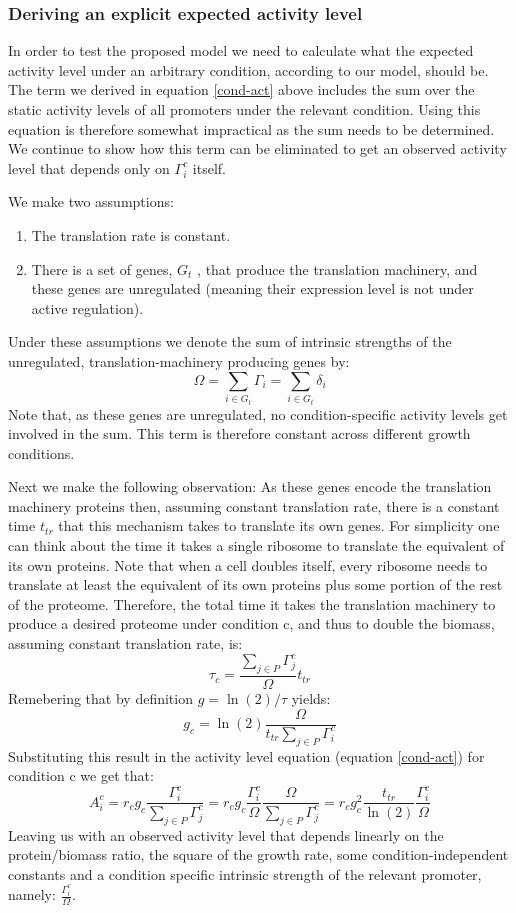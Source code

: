 \documentclass{report}
\begin{document}
\subsubsection{Deriving an explicit expected activity level}
In order to test the proposed model we need to calculate what the expected activity level under an arbitrary condition, according to our model, should be.
The term we derived in equation \ref{cond-act} above includes the sum over the static activity levels of all promoters under the relevant condition.
Using this equation is therefore somewhat impractical as the sum needs to be determined.
We continue to show how this term can be eliminated to get an observed activity level that depends only on $\Gamma^c_i$ itself.

We make two assumptions:
\begin{enumerate}
\item The translation rate is constant.
\item There is a set of genes, $G_t$ , that produce the translation machinery, and these genes are unregulated (meaning their expression level is not under active regulation).
\end{enumerate}
Under these assumptions we denote the sum of intrinsic strengths of the unregulated, translation-machinery producing genes by:
\[\Omega=\sum_{i \in G_t}\Gamma_i=\sum_{i \in G_t}\delta_i\]
Note that, as these genes are unregulated, no condition-specific activity levels get involved in the sum.
This term is therefore constant across different growth conditions.

Next we make the following observation:
As these genes encode the translation machinery proteins then, assuming constant translation rate, there is a constant time $t_{tr}$ that this mechanism takes to translate its own genes.
For simplicity one can think about the time it takes a single ribosome to translate the equivalent of its own proteins.
Note that when a cell doubles itself, every ribosome needs to translate at least the equivalent of its own proteins plus some portion of the rest of the proteome.
Therefore, the total time it takes the translation machinery to produce a desired proteome under condition c, and thus to double the biomass, assuming constant translation rate, is:
\[\tau_c=\frac{\sum_{j\in P}\Gamma^c_j}{\Omega}t_{tr}\]
Remebering that by  definition $g=\ln(2)/\tau$ yields:
\[g_c=\ln(2)\frac{\Omega}{t_{tr}\sum_{j\in P}\Gamma^c_i}\]
Substituting this result in the activity level equation (equation \ref{cond-act}) for condition c we get that:
\begin{equation}
\label{ind-act}
A^c_i=r_c g_c \frac{\Gamma^c_i}{\sum_{j\in P}\Gamma^c_j}=r_c g_c \frac{\Gamma^c_i}{\Omega}\frac{\Omega}{\sum_{j\in P}\Gamma^c_j}=r_c g_c^2\frac{t_{tr}}{\ln(2)}\frac{\Gamma^c_i}{\Omega}
\end{equation}
Leaving us with an observed activity level that depends linearly on the protein/biomass ratio, the square of the growth rate, some condition-independent constants and a condition specific intrinsic strength of the relevant promoter, namely: $\frac{\Gamma^c_i}{\Omega}$.
\end{document}
